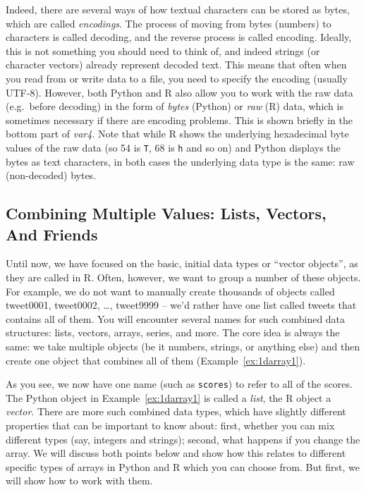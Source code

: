 Indeed, there are several ways of how textual characters can be stored as bytes,
which are called \emph{encodings}. 
The process of moving from bytes (numbers) to characters is called decoding,
and the reverse process is called encoding. 
Ideally, this is not something you should need to think of,
and indeed strings (or character vectors) already represent decoded text.
This means that often when you read from or write data to a file,
you need to specify the encoding (usually UTF-8). 
However, both Python and R also allow you to work with the raw data
(e.g.\ before decoding) in the form of \emph{bytes} (Python) or \emph{raw} (R) data,
which is sometimes necessary if there are encoding problems.
This is shown briefly in the bottom part of \emph{var4}.
Note that while R shows the underlying hexadecimal byte values of the raw data (so 54 is \verb|T|, 68 is \verb|h| and so on) and Python 
displays the bytes as text characters, in both cases the underlying data type is the same: raw (non-decoded) bytes.



\subsection{Combining Multiple Values: Lists, Vectors, And Friends}\label{sec:collections}

Until now, we have focused on the basic, initial data types or ``vector
objects'', as they are called in R.  Often, however, we want to group
a number of these objects. For example, we do not want to manually
create thousands of objects called tweet0001, tweet0002, \ldots,
tweet9999 -- we'd rather have one list called tweets that contains all
of them. You will encounter several names for such combined data
structures: lists, vectors, arrays, series, and 
more. 
The core idea is always the same: we take multiple objects
(be it numbers, strings, or anything else) and then create one object that combines all of them (Example~\ref{ex:1darray1}).


As you see, we now have one name (such as \verb|scores|) to refer to all of the scores.
The Python object in Example~\ref{ex:1darray1} is called a \emph{list}, the R object a \emph{vector}.
There are more  such combined data types, which have slightly different
properties that can be important to know about: first, whether you can mix different
types (say, integers and strings); second, what happens if you change the array.
We will discuss both points below and show how this relates to different
specific types of arrays in Python and R which you can choose from. But first,
we will show how to work with them.


